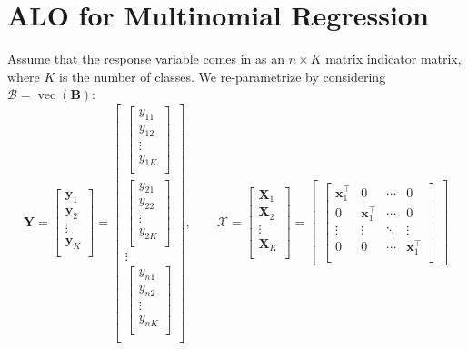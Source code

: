 \documentclass[11pt]{article}
\newcommand{\bx}{\bm{x}}
\newcommand{\by}{\bm{y}}
\newcommand{\bX}{\bm{X}}
\newcommand{\bY}{\bm{Y}}
\newcommand{\bXb}{\bm{\mathcal{X}}}
\newcommand{\bBb}{\bm{\mathcal{B}}}
\begin{document}
\section{ALO for Multinomial Regression}
Assume that the response variable comes in as an \(n\times K\) matrix indicator matrix, where \(K\) is the number of classes. We re-parametrize by considering \(\bBb=\operatorname{vec}(\bm{B})\):
\[\bY=\begin{bmatrix}
\by_{1} \\
\by_{2} \\
\vdots \\
\by_{K} \\
\end{bmatrix}=\begin{bmatrix}
\begin{bmatrix}
y_{11} \\
y_{12} \\
\vdots \\
y_{1K} \\
\end{bmatrix} \\
\begin{bmatrix}
y_{21} \\
y_{22} \\
\vdots \\
y_{2K} \\
\end{bmatrix} \\
\vdots \\
\begin{bmatrix}
y_{n1} \\
y_{n2} \\
\vdots \\
y_{nK} \\
\end{bmatrix} \\
\end{bmatrix},\qquad
\bXb=\begin{bmatrix}
\bX_{1} \\
\bX_{2} \\
\vdots \\
\bX_{K} \\
\end{bmatrix}=\begin{bmatrix}
\begin{bmatrix}
\bx_1^\top & 0 & \cdots & 0 \\
0 & \bx_1^\top & \cdots & 0 \\
\vdots & \vdots & \ddots & \vdots \\
0 & 0 & \cdots & \bx_1^\top \\

\end{bmatrix}
\end{bmatrix}\]
\end{document}
